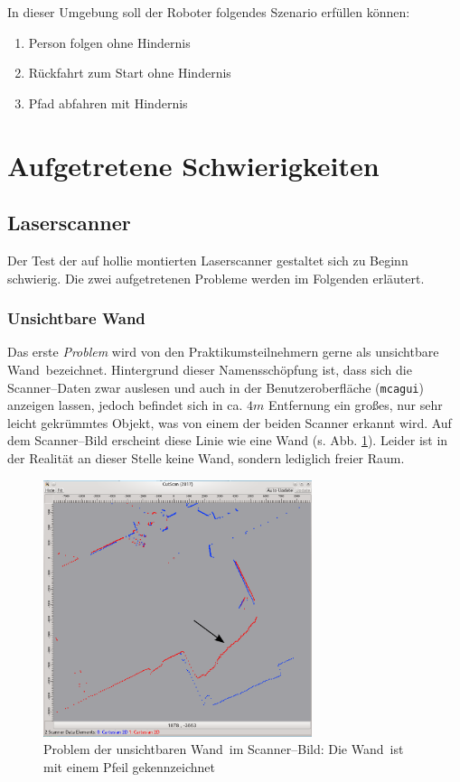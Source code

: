 In dieser Umgebung soll der Roboter folgendes Szenario erfüllen können:
\begin{enumerate}
  \item Person folgen ohne Hindernis
  \item Rückfahrt zum Start ohne Hindernis
  \item Pfad abfahren mit Hindernis
\end{enumerate}



\section{Aufgetretene Schwierigkeiten}

\subsection{Laserscanner}
\label{test_schwierigkeiten_laserscanner_sec}

Der Test der auf \gls{hollie} montierten Laserscanner gestaltet sich zu Beginn schwierig.
Die zwei aufgetretenen Probleme werden im Folgenden erläutert.

\subsubsection{\glqq Unsichtbare Wand\grqq}

Das erste \emph{Problem} wird von den Praktikumsteilnehmern gerne als \glqq unsichtbare Wand\grqq\ bezeichnet.
Hintergrund dieser Namensschöpfung ist, dass sich die Scanner--Daten zwar auslesen und auch in der Benutzeroberfläche (\lstinline{mcagui}) anzeigen lassen, jedoch befindet sich in ca. $4m$ Entfernung ein großes, nur sehr leicht gekrümmtes Objekt, was von einem der beiden Scanner erkannt wird.
Auf dem Scanner--Bild erscheint diese Linie wie eine Wand (s. Abb. \ref{fig:scanner_problem}).
Leider ist in der Realität an dieser Stelle keine Wand, sondern lediglich freier Raum.

\begin{figure}[h]
	\centering
	\includegraphics[width=0.7\textwidth]{graphics/cutscan_fehler}
	\caption[\glqq Unsichtbare Wand\grqq]{Problem der \glqq unsichtbaren Wand\grqq\ im Scanner--Bild: Die \glqq Wand\grqq\ ist mit einem Pfeil gekennzeichnet}
	\label{fig:scanner_problem}
\end{figure}

